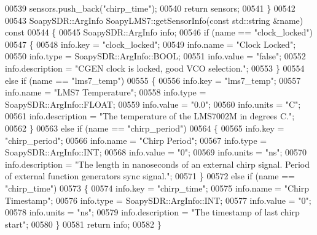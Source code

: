 \begin{DoxyCode}
{{{{{{{{{{{{{{00539     sensors.push\_back(\textcolor{stringliteral}{"chirp\_time"});
00540     \textcolor{keywordflow}{return} sensors;
00541 \}
00542 
00543 SoapySDR::ArgInfo SoapyLMS7::getSensorInfo(\textcolor{keyword}{const} std::string &name)\textcolor{keyword}{ const}
00544 \textcolor{keyword}{}\{
00545     SoapySDR::ArgInfo info;
00546     \textcolor{keywordflow}{if} (name == \textcolor{stringliteral}{"clock\_locked"})
00547     \{
00548         info.key = \textcolor{stringliteral}{"clock\_locked"};
00549         info.name = \textcolor{stringliteral}{"Clock Locked"};
00550         info.type = SoapySDR::ArgInfo::BOOL;
00551         info.value = \textcolor{stringliteral}{"false"};
00552         info.description = \textcolor{stringliteral}{"CGEN clock is locked, good VCO selection."};
00553     \}
00554     \textcolor{keywordflow}{else} \textcolor{keywordflow}{if} (name == \textcolor{stringliteral}{"lms7\_temp"})
00555     \{
00556         info.key = \textcolor{stringliteral}{"lms7\_temp"};
00557         info.name = \textcolor{stringliteral}{"LMS7 Temperature"};
00558         info.type = SoapySDR::ArgInfo::FLOAT;
00559         info.value = \textcolor{stringliteral}{"0.0"};
00560         info.units = \textcolor{stringliteral}{"C"};
00561         info.description = \textcolor{stringliteral}{"The temperature of the LMS7002M in degrees C."};
00562     \}
00563     \textcolor{keywordflow}{else} \textcolor{keywordflow}{if} (name == \textcolor{stringliteral}{"chirp\_period"})
00564     \{
00565         info.key = \textcolor{stringliteral}{"chirp\_period"};
00566         info.name = \textcolor{stringliteral}{"Chirp Period"};
00567         info.type = SoapySDR::ArgInfo::INT;
00568         info.value = \textcolor{stringliteral}{"0"};
00569         info.units = \textcolor{stringliteral}{"ns"};
00570         info.description = \textcolor{stringliteral}{"The length in nanoseconds of an external chirp signal. Period of external
       function generators sync signal."};
00571     \}
00572     \textcolor{keywordflow}{else} \textcolor{keywordflow}{if} (name == \textcolor{stringliteral}{"chirp\_time"})
00573     \{
00574         info.key = \textcolor{stringliteral}{"chirp\_time"};
00575         info.name = \textcolor{stringliteral}{"Chirp Timestamp"};
00576         info.type = SoapySDR::ArgInfo::INT;
00577         info.value = \textcolor{stringliteral}{"0"};
00578         info.units = \textcolor{stringliteral}{"ns"};
00579         info.description = \textcolor{stringliteral}{"The timestamp of last chirp start"};
00580     \}
00581     \textcolor{keywordflow}{return} info;
00582 \}
}}}}}}}}}}}}}}
\end{DoxyCode}
